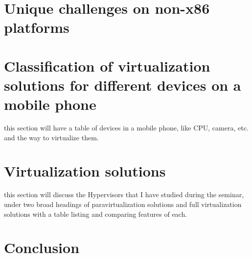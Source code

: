\documentclass[a4paper,10pt]{article}
\begin{document}
\section{Unique challenges on non-x86 platforms}


\section{Classification of virtualization solutions for different devices on a mobile phone}
this section will have a table of devices in a mobile phone, like CPU, camera, etc. and the way to virtualize them.

\section{Virtualization solutions}
this section will discuss the Hypervisors that I have studied during the seminar, under two broad headings of paravirtualization solutions and full virtualization solutions
with a table listing and comparing features of each.
\section{Conclusion}
\end{document}
